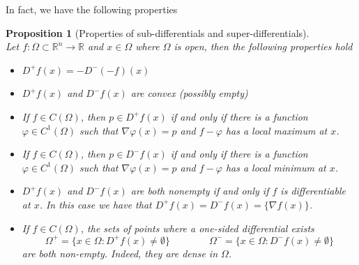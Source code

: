 \documentclass[12pt, oneside]{amsart}  	%
\newtheorem{proposition}{Proposition}
\begin{document}
In fact, we have the following properties 
\begin{proposition}[Properties of sub-differentials and super-differentials]\quad \\
Let $f:\Omega\subset \mathbb{R}^n\longrightarrow \mathbb{R}$ and $x\in \Omega$ where $\Omega$ is open, then the following properties hold
\begin{itemize}
\item[(a)] $D^+f(x) = -D^-(-f)(x)$
\item[(b)] $D^+f(x)$ and $D^-f(x)$ are convex (possibly empty)
\item[(c)] If $f\in C(\Omega)$, then $p\in D^+f(x)$ if and only if there is a function $\varphi \in C^1(\Omega)$ such that $\nabla \varphi (x) = p$ and $f - \varphi$ has a local maximum at $x$.
\item[(d)] If $f\in C(\Omega)$, then $p\in D^-f(x)$ if and only if there is a function $\varphi \in C^1(\Omega)$ such that $\nabla \varphi (x) = p$ and $f - \varphi$ has a local minimum at $x$.
\item[(e)] $D^+f(x)$ and $D^-f(x)$ are both nonempty if and only if $f$ is differentiable at $x$. In this case we have that $D^+f(x) = D^-f(x) = \{\nabla f(x) \}$.
\item[(f)] If $f\in C(\Omega)$, the sets of points where a one-sided differential exists
\begin{equation*}
\Omega^+ = \{x\in \Omega:D^+f(x)\neq \emptyset \} \qquad\qquad\Omega^- = \{x\in \Omega:D^-f(x)\neq \emptyset \}
\end{equation*}
are both non-empty. Indeed, they are dense in $\Omega$.
\end{itemize}
\end{proposition}
\end{document}
